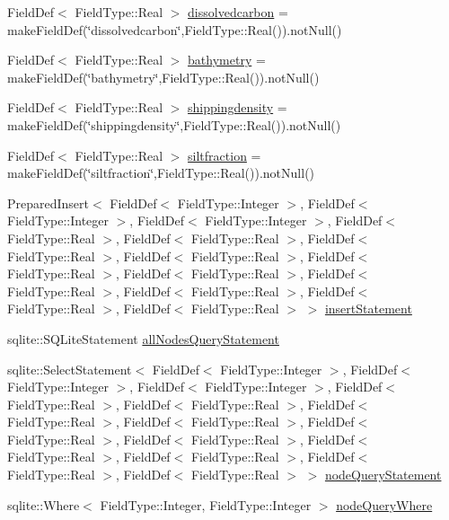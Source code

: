 \begin{DoxyCompactItemize}
\item 
Field\+Def$<$ Field\+Type\+::\+Real $>$ \mbox{\hyperlink{struct_nodes_envt_table_1_1_impl_a65c0b1818da1552dff468bfcbe792671}{dissolvedcarbon}} = make\+Field\+Def(\char`\"{}dissolvedcarbon\char`\"{},Field\+Type\+::\+Real()).not\+Null()
\item 
Field\+Def$<$ Field\+Type\+::\+Real $>$ \mbox{\hyperlink{struct_nodes_envt_table_1_1_impl_a142249f8383d3b51071ea1dd3d698673}{bathymetry}} = make\+Field\+Def(\char`\"{}bathymetry\char`\"{},Field\+Type\+::\+Real()).not\+Null()
\item 
Field\+Def$<$ Field\+Type\+::\+Real $>$ \mbox{\hyperlink{struct_nodes_envt_table_1_1_impl_aaf7fc7f7b8f4e2777d8f660a06c9b75d}{shippingdensity}} = make\+Field\+Def(\char`\"{}shippingdensity\char`\"{},Field\+Type\+::\+Real()).not\+Null()
\item 
Field\+Def$<$ Field\+Type\+::\+Real $>$ \mbox{\hyperlink{struct_nodes_envt_table_1_1_impl_a6be200e48ada03ff07aa017b312994fb}{siltfraction}} = make\+Field\+Def(\char`\"{}siltfraction\char`\"{},Field\+Type\+::\+Real()).not\+Null()
\item 
Prepared\+Insert$<$ Field\+Def$<$ Field\+Type\+::\+Integer $>$, Field\+Def$<$ Field\+Type\+::\+Integer $>$, Field\+Def$<$ Field\+Type\+::\+Integer $>$, Field\+Def$<$ Field\+Type\+::\+Real $>$, Field\+Def$<$ Field\+Type\+::\+Real $>$, Field\+Def$<$ Field\+Type\+::\+Real $>$, Field\+Def$<$ Field\+Type\+::\+Real $>$, Field\+Def$<$ Field\+Type\+::\+Real $>$, Field\+Def$<$ Field\+Type\+::\+Real $>$, Field\+Def$<$ Field\+Type\+::\+Real $>$, Field\+Def$<$ Field\+Type\+::\+Real $>$, Field\+Def$<$ Field\+Type\+::\+Real $>$, Field\+Def$<$ Field\+Type\+::\+Real $>$ $>$ \mbox{\hyperlink{struct_nodes_envt_table_1_1_impl_a154d7b5b01542198708786d59c2102a4}{insert\+Statement}}
\item 
sqlite\+::\+S\+Q\+Lite\+Statement \mbox{\hyperlink{struct_nodes_envt_table_1_1_impl_a42066f406ef9383488820231d6c5c0e7}{all\+Nodes\+Query\+Statement}}
\item 
sqlite\+::\+Select\+Statement$<$ Field\+Def$<$ Field\+Type\+::\+Integer $>$, Field\+Def$<$ Field\+Type\+::\+Integer $>$, Field\+Def$<$ Field\+Type\+::\+Integer $>$, Field\+Def$<$ Field\+Type\+::\+Real $>$, Field\+Def$<$ Field\+Type\+::\+Real $>$, Field\+Def$<$ Field\+Type\+::\+Real $>$, Field\+Def$<$ Field\+Type\+::\+Real $>$, Field\+Def$<$ Field\+Type\+::\+Real $>$, Field\+Def$<$ Field\+Type\+::\+Real $>$, Field\+Def$<$ Field\+Type\+::\+Real $>$, Field\+Def$<$ Field\+Type\+::\+Real $>$, Field\+Def$<$ Field\+Type\+::\+Real $>$, Field\+Def$<$ Field\+Type\+::\+Real $>$ $>$ \mbox{\hyperlink{struct_nodes_envt_table_1_1_impl_a00f2de6a6a3726878211866fccf3fb37}{node\+Query\+Statement}}
\item 
sqlite\+::\+Where$<$ Field\+Type\+::\+Integer, Field\+Type\+::\+Integer $>$ \mbox{\hyperlink{struct_nodes_envt_table_1_1_impl_add273fa2bf6f66d08fb43542c19b37f0}{node\+Query\+Where}}
\end{DoxyCompactItemize}


